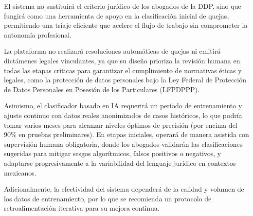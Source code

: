 El sistema no sustituirá el criterio jurídico de los abogados de la DDP, sino que fungirá como una herramienta de apoyo en la clasificación inicial de quejas, permitiendo una triaje eficiente que acelere el flujo de trabajo sin comprometer la autonomía profesional. 

La plataforma no realizará resoluciones automáticas de quejas ni emitirá dictámenes legales vinculantes, ya que su diseño prioriza la revisión humana en todas las etapas críticas para garantizar el cumplimiento de normativas éticas y legales, como la protección de datos personales bajo la Ley Federal de Protección de Datos Personales en Posesión de los Particulares (LFPDPPP). 

Asimismo, el clasificador basado en IA requerirá un período de entrenamiento y ajuste continuo con datos reales anonimizados de casos históricos, lo que podría tomar varios meses para alcanzar niveles óptimos de precisión (por encima del 90\% en pruebas preliminares). En etapas iniciales, operará de manera asistida con supervisión humana obligatoria, donde los abogados validarán las clasificaciones sugeridas para mitigar sesgos algorítmicos, falsos positivos o negativos, y adaptarse progresivamente a la variabilidad del lenguaje jurídico en contextos mexicanos.
 
Adicionalmente, la efectividad del sistema dependerá de la calidad y volumen de los datos de entrenamiento, por lo que se recomienda un protocolo de retroalimentación iterativa para su mejora continua.